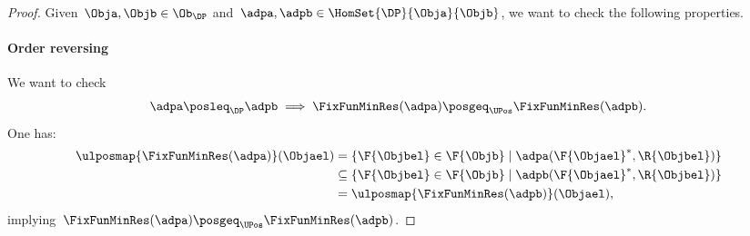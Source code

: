 \begin{proof}
    Given~$\Obja,\Objb \in \Ob_\DP$ and~$\adpa,\adpb \in \HomSet{\DP}{\Obja}{\Objb}$, we want to check the following properties.
    \paragraph*{Order reversing}
    We want to check
    \begin{equation*}
        \adpa \posleq_\DP \adpb \implies \FixFunMinRes(\adpa) \posgeq_\UPos \FixFunMinRes(\adpb).
    \end{equation*}
    One has:
    \begin{equation*}
        \begin{aligned}
            \ulposmap{\FixFunMinRes(\adpa)}(\Objael)&=\{\F{\Objbel} \in \F{\Objb} \mid \adpa(\F{\Objael}^*, \R{\Objbel})\}\\
            &\subseteq \{\F{\Objbel} \in \F{\Objb} \mid \adpb(\F{\Objael}^*, \R{\Objbel})\}\\
            &= \ulposmap{\FixFunMinRes(\adpb)}(\Objael),
        \end{aligned}
    \end{equation*}
    implying~$\FixFunMinRes(\adpa) \posgeq_\UPos \FixFunMinRes(\adpb)$.

\end{proof}
